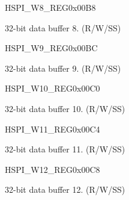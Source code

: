 \begin{register}{H}{SPI\_W8\_REG}{0x00B8}\label{regdesc:SPIW8REG}
%
\regnewline%
\begin{regdesc}\begin{reglist}
\label{fielddesc:SPIBUF8}\item [SPI\_BUF8] 32-bit data buffer 8. (R/W/SS)
\end{reglist}\end{regdesc}
\end{register}


\begin{register}{H}{SPI\_W9\_REG}{0x00BC}\label{regdesc:SPIW9REG}
%
\regnewline%
\begin{regdesc}\begin{reglist}
\label{fielddesc:SPIBUF9}\item [SPI\_BUF9] 32-bit data buffer 9. (R/W/SS)
\end{reglist}\end{regdesc}
\end{register}


\begin{register}{H}{SPI\_W10\_REG}{0x00C0}\label{regdesc:SPIW10REG}
%
\regnewline%
\begin{regdesc}\begin{reglist}
\label{fielddesc:SPIBUF10}\item [SPI\_BUF10] 32-bit data buffer 10. (R/W/SS)
\end{reglist}\end{regdesc}
\end{register}


\begin{register}{H}{SPI\_W11\_REG}{0x00C4}\label{regdesc:SPIW11REG}
%
\regnewline%
\begin{regdesc}\begin{reglist}
\label{fielddesc:SPIBUF11}\item [SPI\_BUF11] 32-bit data buffer 11. (R/W/SS)
\end{reglist}\end{regdesc}
\end{register}


\begin{register}{H}{SPI\_W12\_REG}{0x00C8}\label{regdesc:SPIW12REG}
%
\regnewline%
\begin{regdesc}\begin{reglist}
\label{fielddesc:SPIBUF12}\item [SPI\_BUF12] 32-bit data buffer 12. (R/W/SS)
\end{reglist}\end{regdesc}
\end{register}



